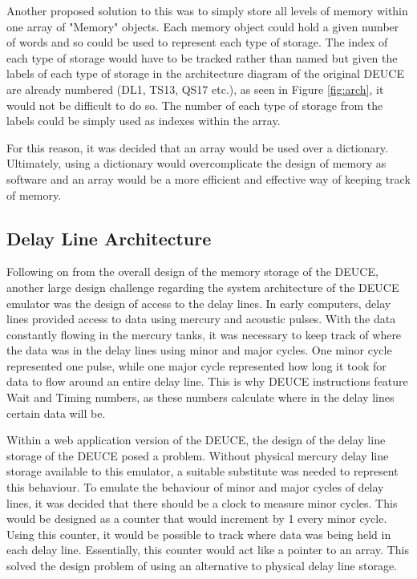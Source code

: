 \documentclass{l4proj}
\begin{document}
Another proposed solution to this was to simply store all levels of memory within one array of "Memory" objects. Each memory object could hold a given number of words and so could be used to represent each type of storage. The index of each type of storage would have to be tracked rather than named but given the labels of each type of storage in the architecture diagram of the original DEUCE are already numbered (DL1, TS13, QS17 etc.), as seen in Figure \ref{fig:arch}, it would not be difficult to do so. The number of each type of storage from the labels could be simply used as indexes within the array.

For this reason, it was decided that an array would be used over a dictionary. Ultimately, using a dictionary would overcomplicate the design of memory as software and an array would be a more efficient and effective way of keeping track of memory.
\subsection{Delay Line Architecture}
Following on from the overall design of the memory storage of the DEUCE, another large design challenge regarding the system architecture of the DEUCE emulator was the design of access to the delay lines. In early computers, delay lines provided access to data using mercury and acoustic pulses. With the data constantly flowing in the mercury tanks, it was necessary to keep track of where the data was in the delay lines using minor and major cycles. One minor cycle represented one pulse, while one major cycle represented how long it took for data to flow around an entire delay line. This is why DEUCE instructions feature Wait and Timing numbers, as these numbers calculate where in the delay lines certain data will be.

Within a web application version of the DEUCE, the design of the delay line storage of the DEUCE posed a problem. Without physical mercury delay line storage available to this emulator, a suitable substitute was needed to represent this behaviour. To emulate the behaviour of minor and major cycles of delay lines, it was decided that there should be a clock to measure minor cycles. This would be designed as a counter that would increment by 1 every minor cycle. Using this counter, it would be possible to track where data was being held in each delay line. Essentially, this counter would act like a pointer to an array. This solved the design problem of using an alternative to physical delay line storage.
\end{document}
